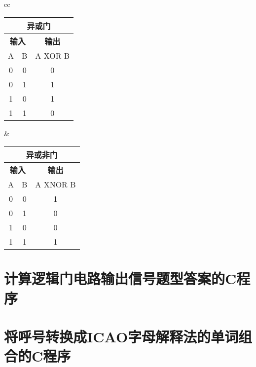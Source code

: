 \begin{tabular}{cc}%
  \begin{tabular}{|c|c|c|}
    \multicolumn{3}{c}{\textbf{异或门}}                          \\
    \hline
    \multicolumn{2}{|c|}{\textbf{输入}} & \textbf{输出}           \\
    \hline
    A                                 & B           & A XOR B \\
    \hline
    \num{0}                           & \num{0}     & \num{0} \\
    \hline
    \num{0}                           & \num{1}     & \num{1} \\
    \hline
    \num{1}                           & \num{0}     & \num{1} \\
    \hline
    \num{1}                           & \num{1}     & \num{0} \\
    \hline
  \end{tabular} &
  \begin{tabular}{|c|c|c|}
    \multicolumn{3}{c}{\textbf{异或非门}}                          \\
    \hline
    \multicolumn{2}{|c|}{\textbf{输入}} & \textbf{输出}            \\
    \hline
    A                                 & B           & A XNOR B \\
    \hline
    \num{0}                           & \num{0}     & \num{1}  \\
    \hline
    \num{0}                           & \num{1}     & \num{0}  \\
    \hline
    \num{1}                           & \num{0}     & \num{0}  \\
    \hline
    \num{1}                           & \num{1}     & \num{1}  \\
    \hline
  \end{tabular} \tabularnewline
\end{tabular}

\newpage

\section{计算逻辑门电路输出信号题型答案的C程序}



\newpage

\section{将呼号转换成ICAO字母解释法的单词组合的C程序}

